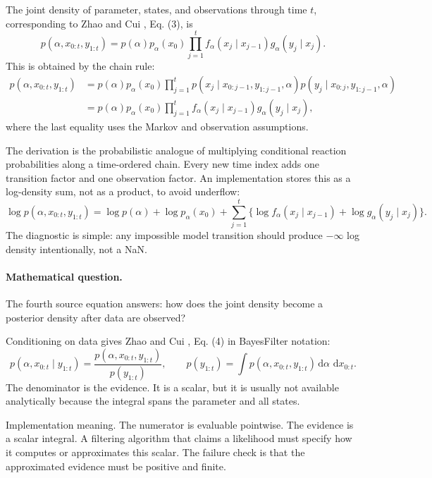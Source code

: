 \documentclass[11pt]{article}
\newcommand{\dd}{\,\mathrm d}
\begin{document}
The joint density of parameter, states, and observations through time \(t\),
corresponding to Zhao and Cui \cite{zhao2024ttsequential}, Eq. (3), is
\[
    p(\alpha,x_{0:t},y_{1:t})
    =
    p(\alpha)p_\alpha(x_0)
    \prod_{j=1}^{t}
    f_\alpha(x_j\mid x_{j-1})g_\alpha(y_j\mid x_j).
    \label{eq:p24-bf-3}
\]
This is obtained by the chain rule:
\[
\begin{aligned}
 p(\alpha,x_{0:t},y_{1:t})
 &=
 p(\alpha)p_\alpha(x_0)
 \prod_{j=1}^t
 p(x_j\mid x_{0:j-1},y_{1:j-1},\alpha)
 p(y_j\mid x_{0:j},y_{1:j-1},\alpha)\\
 &=
 p(\alpha)p_\alpha(x_0)
 \prod_{j=1}^t
 f_\alpha(x_j\mid x_{j-1})g_\alpha(y_j\mid x_j),
\end{aligned}
\]
where the last equality uses the Markov and observation assumptions.

The derivation is the probabilistic analogue of multiplying conditional
reaction probabilities along a time-ordered chain.  Every new time index adds
one transition factor and one observation factor.  An implementation stores
this as a log-density sum, not as a product, to avoid underflow:
\[
    \log p(\alpha,x_{0:t},y_{1:t})
    =
    \log p(\alpha)+\log p_\alpha(x_0)
    +
    \sum_{j=1}^t
    \{\log f_\alpha(x_j\mid x_{j-1})+\log g_\alpha(y_j\mid x_j)\}.
    \label{eq:p24-bf-3a}
\]
The diagnostic is simple: any impossible model transition should produce
\(-\infty\) log density intentionally, not a NaN.

\paragraph{Mathematical question.}
The fourth source equation answers: how does the joint density become a
posterior density after data are observed?

Conditioning on data gives Zhao and Cui \cite{zhao2024ttsequential}, Eq. (4) in BayesFilter notation:
\[
    p(\alpha,x_{0:t}\mid y_{1:t})
    =
    \frac{p(\alpha,x_{0:t},y_{1:t})}
    {p(y_{1:t})},
    \qquad
    p(y_{1:t})
    =
    \int p(\alpha,x_{0:t},y_{1:t})
    \dd\alpha\,\dd x_{0:t}.
    \label{eq:p24-bf-4}
\]
The denominator is the evidence.  It is a scalar, but it is usually not
available analytically because the integral spans the parameter and all states.

Implementation meaning. The numerator is evaluable pointwise.  The
evidence is a scalar integral.  A filtering algorithm that claims a likelihood
must specify how it computes or approximates this scalar.  The failure check is
that the approximated evidence must be positive and finite.
\end{document}

